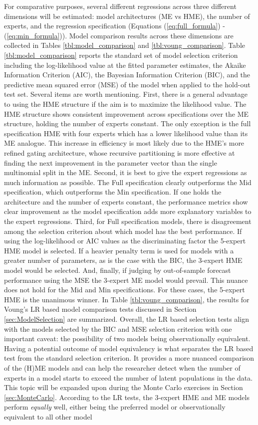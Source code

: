 \documentclass[12pt]{article}
\theoremstyle{definition}
\begin{document}
For comparative purposes, several different regressions across three different dimensions will be estimated: model architectures (ME vs HME), the number of experts, and the regression specification (Equations (\ref{eq:full_formula}) - (\ref{eq:min_formula})). Model comparison results across these dimensions are collected in Tables \ref{tbl:model_comparison} and \ref{tbl:voung_comparison}. Table \ref{tbl:model_comparison} reports the standard set of model selection criterion including the log-likelihood value at the fitted parameter estimates, the Akaike Information Criterion (AIC), the Bayesian Information Criterion (BIC), and the predictive mean squared error (MSE) of the model when applied to the hold-out test set. Several items are worth mentioning. First, there is a general advantage to using the HME structure if the aim is to maximize the likelihood value. The HME structure shows consistent improvement across specifications over the ME structure, holding the number of experts constant. The only exception is the full specification HME with four experts which has a lower likelihood value than its ME analogue. This increase in efficiency is most likely due to the HME's more refined gating architecture, whose recursive partitioning is more effective at finding the next improvement in the parameter vector than the single multinomial split in the ME. Second, it is best to give the expert regressions as much information as possible. The Full specification clearly outperforms the Mid specification, which outperforms the Min specification. If one holds the architecture and the number of experts constant, the performance metrics show clear improvement as the model specification adds more explanatory variables to the expert regressions. Third, for Full specification models, there is disagreement among the selection criterion about which model has the best performance. If using the log-likelihood or AIC values as the discriminating factor the 5-expert HME model is selected. If a heavier penalty term is used for models with a greater number of parameters, as is the case with the BIC, the 3-expert HME model would be selected. And, finally, if judging by out-of-sample forecast performance using the MSE the 3-expert ME model would prevail. This nuance does not hold for the Mid and Min specifications. For these cases, the 5-expert HME is the unanimous winner. In Table \ref{tbl:voung_comparison}, the results for Voung's LR based model comparison tests discussed in Section \ref{sec:ModelSelection} are summarized. Overall, the LR based selection tests align with the models selected by the BIC and MSE selection criterion with one important caveat: the possibility of two models being observationally equivalent. Having a potential outcome of model equivalency is what separates the LR based test from the standard selection criterion. It provides a more nuanced comparison of the (H)ME models and can help the researcher detect when the number of experts in a model starts to exceed the number of latent populations in the data. This topic will be expanded upon during the Monte Carlo exercises in Section \ref{sec:MonteCarlo}. According to the LR tests, the 3-expert HME and ME models perform \emph{equally} well, either being the preferred model or observationally equivalent to all other model 
\end{document}
